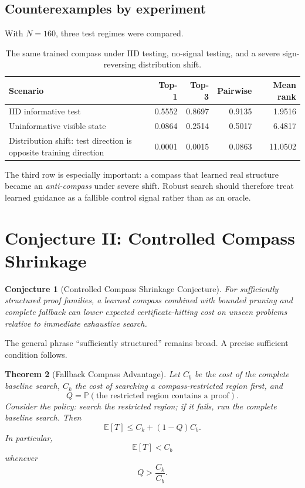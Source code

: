 \documentclass[11pt]{article}
\newtheorem{theorem}{Theorem}[section]
\newtheorem{conjecture}[theorem]{Conjecture}
\newcommand{\Prob}{\mathbb{P}}
\newcommand{\E}{\mathbb{E}}
\begin{document}
\subsection{Counterexamples by experiment}

With \(N=160\), three test regimes were compared.

\begin{table}[ht]
\centering
\caption{The same trained compass under IID testing, no-signal testing, and a severe sign-reversing distribution shift.}
\begin{tabularx}{\textwidth}{Xrrrr}
\toprule
Scenario & Top-1 & Top-3 & Pairwise & Mean rank\\
\midrule
IID informative test & 0.5552 & 0.8697 & 0.9135 & 1.9516\\
Uninformative visible state & 0.0864 & 0.2514 & 0.5017 & 6.4817\\
Distribution shift: test direction is opposite training direction & 0.0001 & 0.0015 & 0.0863 & 11.0502\\
\bottomrule
\end{tabularx}
\end{table}

The third row is especially important: a compass that learned real structure became an \emph{anti-compass} under severe shift. Robust search should therefore treat learned guidance as a fallible control signal rather than as an oracle.

\section{Conjecture II: Controlled Compass Shrinkage}

\begin{conjecture}[Controlled Compass Shrinkage Conjecture]
For sufficiently structured proof families, a learned compass combined with bounded pruning and complete fallback can lower expected certificate-hitting cost on unseen problems relative to immediate exhaustive search.
\end{conjecture}

The general phrase ``sufficiently structured'' remains broad. A precise sufficient condition follows.

\begin{theorem}[Fallback Compass Advantage]
Let \(C_b\) be the cost of the complete baseline search, \(C_k\) the cost of searching a compass-restricted region first, and
\[
Q=\Prob(\text{the restricted region contains a proof}).
\]
Consider the policy: search the restricted region; if it fails, run the complete baseline search. Then
\[
\E[T]\le C_k+(1-Q)C_b.
\]
In particular,
\[
\E[T]<C_b
\]
whenever
\[
Q>\frac{C_k}{C_b}.
\]
\end{theorem}
\end{document}
